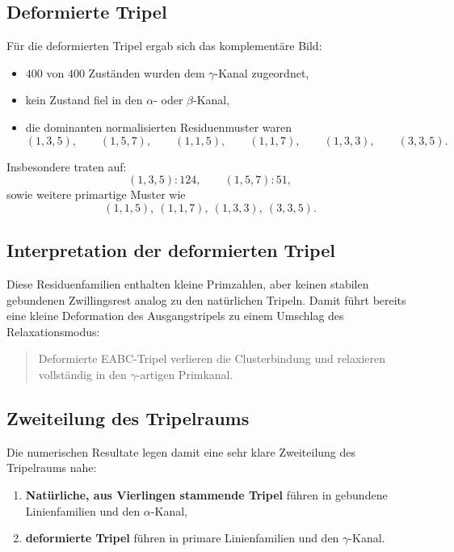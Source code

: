 \documentclass[11pt,a4paper]{article}
\theoremstyle{definition}
\theoremstyle{plain}
\theoremstyle{remark}
\begin{document}
	\subsection{Deformierte Tripel}
	
	Für die deformierten Tripel ergab sich das komplementäre Bild:
	
	\begin{itemize}
		\item \(400\) von \(400\) Zuständen wurden dem \(\gamma\)-Kanal zugeordnet,
		\item kein Zustand fiel in den \(\alpha\)- oder \(\beta\)-Kanal,
		\item die dominanten normalisierten Residuenmuster waren
		\[
		(1,3,5),\qquad
		(1,5,7),\qquad
		(1,1,5),\qquad
		(1,1,7),\qquad
		(1,3,3),\qquad
		(3,3,5).
		\]
	\end{itemize}
	
	Insbesondere traten auf:
	\[
	(1,3,5):124,\qquad
	(1,5,7):51,
	\]
	sowie weitere primartige Muster wie
	\[
	(1,1,5),\ (1,1,7),\ (1,3,3),\ (3,3,5).
	\]
	
	\subsection{Interpretation der deformierten Tripel}
	
	Diese Residuenfamilien enthalten kleine Primzahlen, aber keinen stabilen gebundenen Zwillingsrest analog zu den natürlichen Tripeln. 
	Damit führt bereits eine kleine Deformation des Ausgangstripels zu einem Umschlag des Relaxationsmodus:
	
	\begin{quote}
		Deformierte EABC-Tripel verlieren die Clusterbindung und relaxieren vollständig in den \(\gamma\)-artigen Primkanal.
	\end{quote}
	
	\subsection{Zweiteilung des Tripelraums}
	
	Die numerischen Resultate legen damit eine sehr klare Zweiteilung des Tripelraums nahe:
	
	\begin{enumerate}
		\item \textbf{Natürliche, aus Vierlingen stammende Tripel}  
		führen in gebundene Linienfamilien und den \(\alpha\)-Kanal,
		\item \textbf{deformierte Tripel}  
		führen in primare Linienfamilien und den \(\gamma\)-Kanal.
	\end{enumerate}
	
\end{document}
